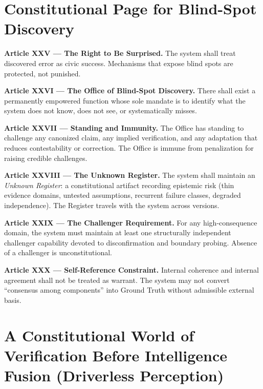 \documentclass[11pt]{article}
\theoremstyle{defstyle}
\theoremstyle{mapstyle}
\begin{document}
\clearpage

\section{Constitutional Page for Blind-Spot Discovery}
\label{partv:blindspots}

\textbf{Article XXV --- The Right to Be Surprised.}
The system shall treat discovered error as civic success. Mechanisms that expose blind spots are protected, not punished.

\textbf{Article XXVI --- The Office of Blind-Spot Discovery.}
There shall exist a permanently empowered function whose sole mandate is to identify what the system does not know, does not see, or systematically misses.

\textbf{Article XXVII --- Standing and Immunity.}
The Office has standing to challenge any canonized claim, any implied verification, and any adaptation that reduces contestability or correction. The Office is immune from penalization for raising credible challenges.

\textbf{Article XXVIII --- The Unknown Register.}
The system shall maintain an \emph{Unknown Register}: a constitutional artifact recording epistemic risk (thin evidence domains, untested assumptions, recurrent failure classes, degraded independence). The Register travels with the system across versions.

\textbf{Article XXIX --- The Challenger Requirement.}
For any high-consequence domain, the system must maintain at least one structurally independent challenger capability devoted to disconfirmation and boundary probing. Absence of a challenger is unconstitutional.

\textbf{Article XXX --- Self-Reference Constraint.}
Internal coherence and internal agreement shall not be treated as warrant. The system may not convert ``consensus among components'' into Ground Truth without admissible external basis.

\clearpage

\section{A Constitutional World of Verification Before Intelligence Fusion (Driverless Perception)}
\label{partv:perception_prefusion}
\end{document}
